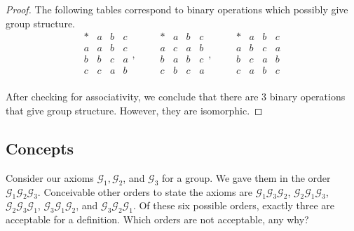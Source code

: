 \begin{proof}
    The following tables correspond to binary operations which possibly give group structure.
    \[
        \begin{array}{c|ccc}
            * & a & b & c \\
            \hline
            a & a & b & c \\
            b & b & c & a \\
            c & c & a & b \\
        \end{array},\qquad
        \begin{array}{c|ccc}
            * & a & b & c \\
            \hline
            a & c & a & b \\
            b & a & b & c \\
            c & b & c & a \\
        \end{array},\qquad
        \begin{array}{c|ccc}
            * & a & b & c \\
            \hline
            a & b & c & a \\
            b & c & a & b \\
            c & a & b & c \\
        \end{array}
    \]

    After checking for associativity, we conclude that there are $3$ binary operations that give group structure. However, they are isomorphic.
\end{proof}

\subsection*{Concepts}

\begin{exercise}
    Consider our axioms $\mathscr{G}_{1}, \mathscr{G}_{2}$, and $\mathscr{G}_{3}$ for a group. We gave them in the order $\mathscr{G}_{1}\mathscr{G}_{2}\mathscr{G}_{3}$. Conceivable other orders to state the axioms are  $\mathscr{G}_{1}\mathscr{G}_{3}\mathscr{G}_{2}$, $\mathscr{G}_{2}\mathscr{G}_{1}\mathscr{G}_{3}$, $\mathscr{G}_{2}\mathscr{G}_{3}\mathscr{G}_{1}$, $\mathscr{G}_{3}\mathscr{G}_{1}\mathscr{G}_{2}$, and $\mathscr{G}_{3}\mathscr{G}_{2}\mathscr{G}_{1}$. Of these six possible orders, exactly three are acceptable for a definition. Which orders are not acceptable, any why?
\end{exercise}

